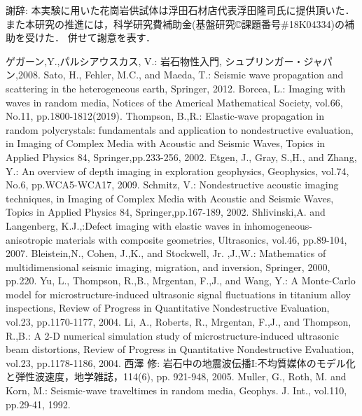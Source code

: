 \documentclass{jsce}
\begin{document}
{\gt 謝辞:}
本実験に用いた花崗岩供試体は浮田石材店代表浮田隆司氏に提供頂いた．
また本研究の推進には，科学研究費補助金(基盤研究©課題番号\#18K04334)の補助を受けた．
併せて謝意を表す．
\begin{thebibliography}{99}
\begin{spacing}{1.175}
	ゲガーン,Y.,パルシアウスカス, V.: 
	岩石物性入門, シュプリンガー・ジャパン,2008. 
	Sato, H., Fehler, M.C., and Maeda, T.: Seismic wave propagation and scattering in the heterogeneous earth, 
	Springer, 2012.
	Borcea, L.: Imaging with waves in random media, Notices of the Americal Mathematical Society, vol.66, No.11, 
	pp.1800-1812(2019).
	Thompson, B.,R.: 
	Elastic-wave propagation in random polycrystals: fundamentals and application to nondestructive evaluation, 
	in Imaging of Complex Media with Acoustic and Seismic Waves, Topics in Applied Physics 84, Springer,pp.233-256, 2002.
	Etgen, J., Gray, S.,H., and Zhang, Y.: An overview of depth imaging in exploration geophysics, 
	Geophysics, vol.74, No.6, pp.WCA5-WCA17, 2009.
	Schmitz, V.: Nondestructive acoustic imaging techniques, in Imaging of Complex Media with Acoustic and Seismic Waves, Topics in Applied Physics 84, Springer,pp.167-189, 2002.
	Shlivinski,A. and Langenberg, K.J.,:Defect imaging with elastic waves in inhomogeneous-anisotropic materials with composite geometries, Ultrasonics, vol.46, pp.89-104, 2007.
	Bleistein,N., Cohen, J.,K., and Stockwell, Jr. ,J.,W.:
	Mathematics of multidimensional seismic imaging, migration, and inversion, Springer, 2000, pp.220.
	Yu, L., Thompson, R.,B., Mrgentan, F.,J., and Wang, Y.:
	A Monte-Carlo model for microstructure-induced ultrasonic signal fluctuations in titanium alloy inspections,
	Review of Progress in Quantitative Nondestructive Evaluation, vol.23, pp.1170-1177, 2004.
	Li, A., Roberts, R., Mrgentan, F.,J., and Thompson, R.,B.: 
	A 2-D numerical simulation study of microstructure-induced  ultrasonic beam distortions,
	Review of Progress in Quantitative Nondestructive Evaluation, vol.23, pp.1178-1186, 2004.
	西澤 修: 岩石中の地震波伝播I:不均質媒体のモデル化と弾性波速度，地学雑誌，114(6), pp. 921-948, 2005.
	Muller, G., Roth, M. and Korn, M.: Seismic-wave traveltimes in random media, 
	Geophys. J. Int., vol.110, pp.29-41, 1992. 

\end{spacing}
\end{thebibliography}
\end{document}
